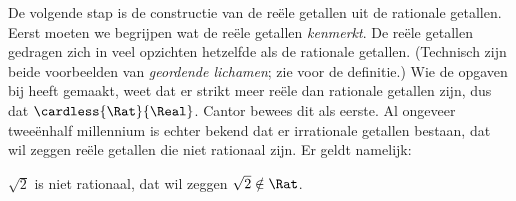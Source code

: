 \documentclass[openany]{memoir}
\begin{document}
De volgende stap is de constructie van de reële getallen uit de
rationale getallen. Eerst moeten we begrijpen wat de reële getallen
\emph{kenmerkt}.
De reële getallen gedragen zich in veel opzichten hetzelfde als de
rationale getallen. (Technisch zijn beide voorbeelden van \emph{geordende
lichamen}; zie  voor de definitie.) Wie de
opgaven bij  heeft gemaakt, weet dat er strikt
meer reële dan rationale getallen zijn, dus dat
$\cardless{\Rat}{\Real}$. Cantor bewees dit als eerste. Al ongeveer
tweeënhalf millennium is echter bekend dat er irrationale getallen
bestaan, dat wil zeggen reële getallen die niet rationaal zijn. Er
geldt namelijk:
\begin{thm}
$\sqrt{2}$ is niet rationaal, dat wil zeggen $\sqrt{2} \notin \Rat$.
\end{thm}
\end{document}
